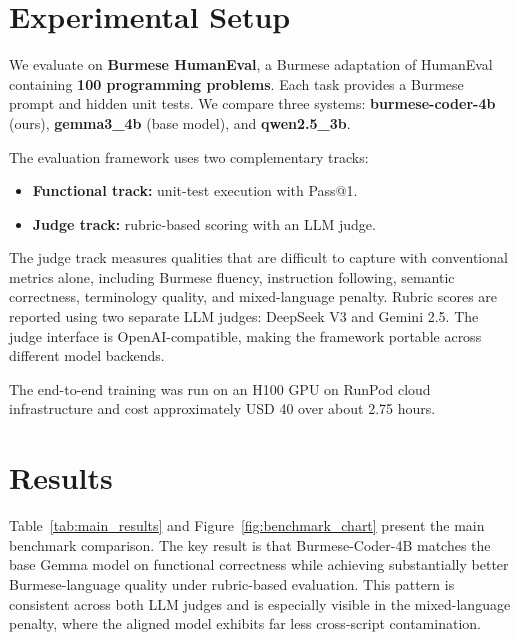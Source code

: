 \documentclass[11pt]{article}
\begin{document}
\section{Experimental Setup}
We evaluate on \textbf{Burmese HumanEval}, a Burmese adaptation of HumanEval containing \textbf{100 programming problems}. Each task provides a Burmese prompt and hidden unit tests. We compare three systems: \textbf{burmese-coder-4b} (ours), \textbf{gemma3\_4b} (base model), and \textbf{qwen2.5\_3b}.

The evaluation framework uses two complementary tracks:
\begin{itemize}[leftmargin=1.2cm]
    \item \textbf{Functional track:} unit-test execution with Pass@1.
    \item \textbf{Judge track:} rubric-based scoring with an LLM judge.
\end{itemize}

The judge track measures qualities that are difficult to capture with conventional metrics alone, including Burmese fluency, instruction following, semantic correctness, terminology quality, and mixed-language penalty. Rubric scores are reported using two separate LLM judges: DeepSeek V3 and Gemini 2.5. The judge interface is OpenAI-compatible, making the framework portable across different model backends.

The end-to-end training was run on an H100 GPU on RunPod cloud infrastructure and cost approximately USD 40 over about 2.75 hours.

\section{Results}
Table~\ref{tab:main_results} and Figure~\ref{fig:benchmark_chart} present the main benchmark comparison. The key result is that Burmese-Coder-4B matches the base Gemma model on functional correctness while achieving substantially better Burmese-language quality under rubric-based evaluation. This pattern is consistent across both LLM judges and is especially visible in the mixed-language penalty, where the aligned model exhibits far less cross-script contamination.
\end{document}
